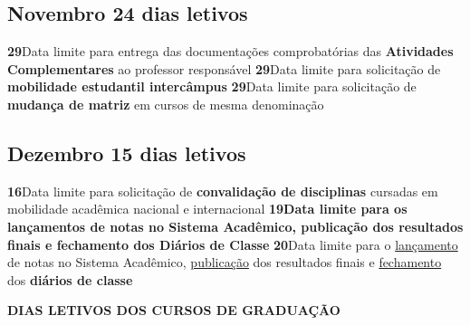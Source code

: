 \documentclass[thesis]{hmcposter}
\begin{document}
\begin{poster}
\subsection{Novembro \hfill 24 dias letivos}\textbf{29}\qquad Data limite para entrega das documentações comprobatórias das \textbf{Atividades Complementares} ao professor responsável \newline \null\textbf{29}\qquad Data limite para solicitação de \textbf{mobilidade estudantil intercâmpus} \newline \null\textbf{29}\qquad Data limite para solicitação de \textbf{mudança de matriz} em cursos de mesma denominação \newline \null\subsection{Dezembro \hfill 15 dias letivos}\textbf{16}\qquad Data limite para solicitação de \textbf{convalidação de disciplinas} cursadas em mobilidade acadêmica nacional e internacional \newline \null\textbf{19}\qquad \textbf{Data limite para os lançamentos de notas no Sistema Acadêmico, publicação dos resultados finais e fechamento dos Diários de Classe} \newline \null\textbf{20}\qquad Data limite para o \underline{lançamento} de notas no Sistema Acadêmico, \underline{publicação} dos resultados finais e \underline{fechamento} dos \textbf{diários de classe} \newline \null\newpage
~
\vfill
\begin{center}
\large \textbf{DIAS LETIVOS DOS CURSOS DE GRADUAÇÃO}
\newline
\null
\newline
\begin{table}
\centering
{}
\end{table}
\null
\end{center}

\end{poster}
\end{document}
